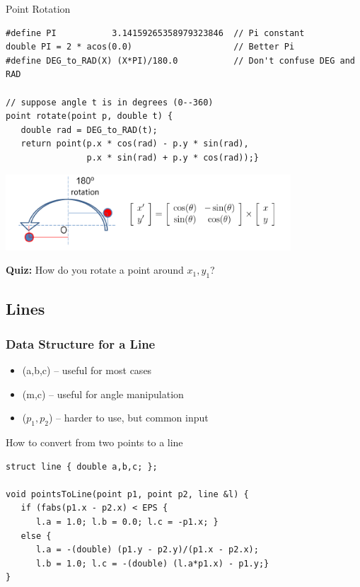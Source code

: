 \begin{frame}[fragile]{Point Rotation}

  {\smaller

    \begin{exampleblock}{}
\begin{verbatim}
#define PI           3.14159265358979323846  // Pi constant
double PI = 2 * acos(0.0)                    // Better Pi
#define DEG_to_RAD(X) (X*PI)/180.0           // Don't confuse DEG and RAD

// suppose angle t is in degrees (0--360)
point rotate(point p, double t) {
   double rad = DEG_to_RAD(t);
   return point(p.x * cos(rad) - p.y * sin(rad),
                p.x * sin(rad) + p.y * cos(rad));}
\end{verbatim}
    \end{exampleblock}
    \begin{center}
      \includegraphics[width=0.8\textwidth]{../img/rotation_halim}
    \end{center}
}
    {\bf Quiz:} How do you rotate a point around $x_1, y_1$?
\end{frame}

\subsection{Lines}

\begin{frame}[fragile]
  \frametitle{Data Structure for a Line}
  \begin{itemize}
  \item {}\hfill (a,b,c) -- useful for most cases
  \item {}\hfill (m,c) -- useful for angle manipulation
  \item {}\hfill ($p_1, p_2$) -- harder to use, but common input
  \end{itemize}

{\smaller
  \begin{exampleblock}{How to convert from two points to a line}
\begin{verbatim}
struct line { double a,b,c; };

void pointsToLine(point p1, point p2, line &l) {
   if (fabs(p1.x - p2.x) < EPS {
      l.a = 1.0; l.b = 0.0; l.c = -p1.x; }
   else {
      l.a = -(double) (p1.y - p2.y)/(p1.x - p2.x);
      l.b = 1.0; l.c = -(double) (l.a*p1.x) - p1.y;}
}
\end{verbatim}
  \end{exampleblock}
  }
\end{frame}


